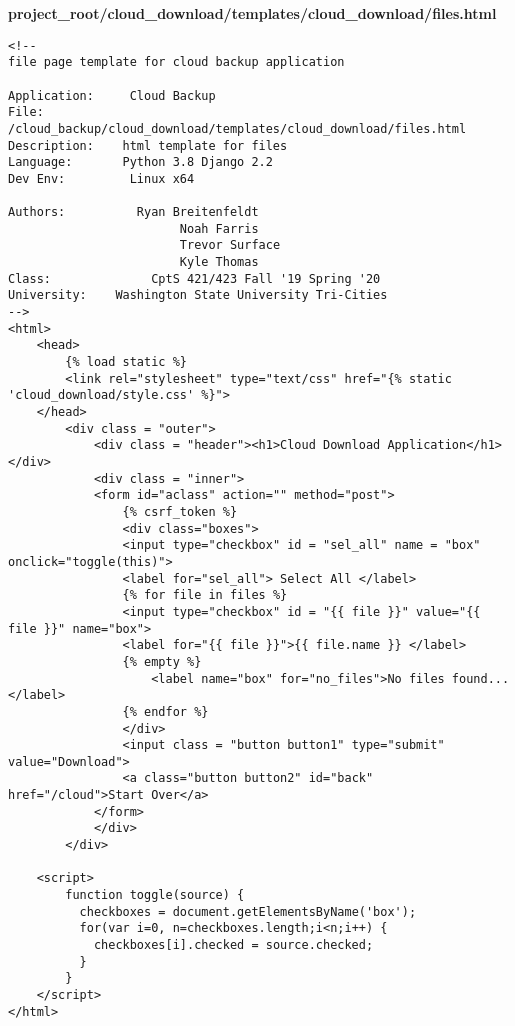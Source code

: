\documentclass{article}
\begin{document}
\newpage
\textbf{project\_root/cloud\_download/templates/cloud\_download/files.html}
\begin{verbatim}
<!--
file page template for cloud backup application

Application:     Cloud Backup
File:                 /cloud_backup/cloud_download/templates/cloud_download/files.html
Description:    html template for files
Language:       Python 3.8 Django 2.2
Dev Env:         Linux x64

Authors:          Ryan Breitenfeldt
                        Noah Farris
                        Trevor Surface
                        Kyle Thomas
Class:              CptS 421/423 Fall '19 Spring '20
University:    Washington State University Tri-Cities
-->
<html>
    <head>
        {% load static %}
        <link rel="stylesheet" type="text/css" href="{% static 'cloud_download/style.css' %}">
    </head>
        <div class = "outer">
            <div class = "header"><h1>Cloud Download Application</h1></div>
            <div class = "inner">
            <form id="aclass" action="" method="post">
                {% csrf_token %}
                <div class="boxes">
                <input type="checkbox" id = "sel_all" name = "box" onclick="toggle(this)">
                <label for="sel_all"> Select All </label>
                {% for file in files %}
                <input type="checkbox" id = "{{ file }}" value="{{ file }}" name="box">
                <label for="{{ file }}">{{ file.name }} </label>
                {% empty %}
                    <label name="box" for="no_files">No files found... </label>
                {% endfor %}
                </div>
                <input class = "button button1" type="submit" value="Download">
                <a class="button button2" id="back" href="/cloud">Start Over</a>
            </form>
            </div>
        </div>

    <script>
        function toggle(source) {
          checkboxes = document.getElementsByName('box');
          for(var i=0, n=checkboxes.length;i<n;i++) {
            checkboxes[i].checked = source.checked;
          }
        }
    </script>
</html>
\end{verbatim}
\end{document}
